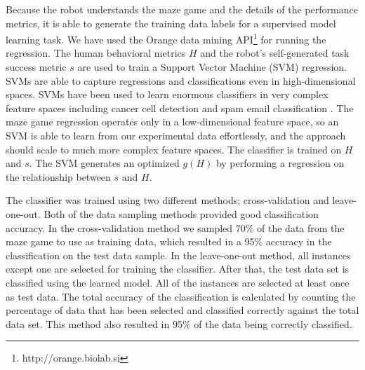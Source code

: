 \documentclass{sig-alternate}
\begin{document}
Because the robot understands the maze game and the details of the
performance metrics, it is able to generate the training data labels
for a supervised model learning task.  We have used the Orange data
mining API\footnote{http://orange.biolab.si} for running the
regression.  The human behavioral metrics $H$ and the robot's
self-generated task success metric $s$ are used to train a Support
Vector Machine (SVM) regression.  SVMs are able to capture regressions
and classifications even in high-dimensional spaces. SVMs have been
used to learn enormous classifiers in very complex feature spaces
including cancer cell detection and spam email classification
\cite{guyon2002gene, drucker1999support}.  The maze game regression
operates only in a low-dimensional feature space, so an SVM is able to
learn from our experimental data effortlessly, and the approach should
scale to much more complex feature spaces.  The classifier is trained
on $H$ and $s$.  The SVM generates an optimized $g(H)$ by performing a
regression on the relationship between $s$ and $H$.

The classifier was trained using two different methods;
cross-validation and leave-one-out.  Both of the data sampling methods
provided good classification accuracy. In the cross-validation method
we sampled 70\% of the data from the maze game to use as training
data, which resulted in a 95\% accuracy in the classification on the
test data sample. In the leave-one-out method, all instances except
one are selected for training the classifier. After that, the test
data set is classified using the learned model. All of the instances
are selected at least once as test data. The total accuracy of the
classification is calculated by counting the percentage of data that
has been selected and classified correctly against the total data
set. This method also resulted in 95\% of the data being correctly
classified.
\end{document}
